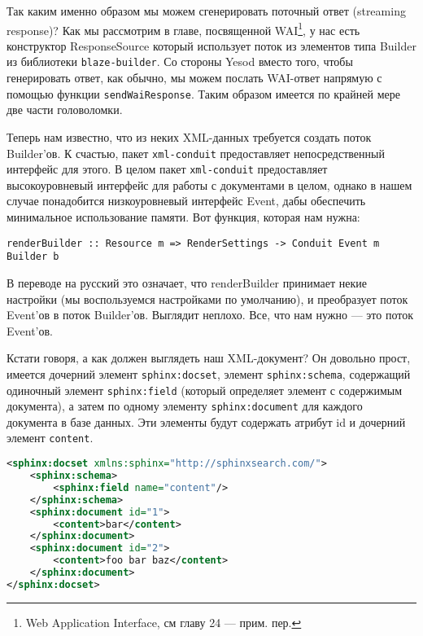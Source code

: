 Так каким именно образом мы можем сгенерировать поточный ответ (streaming response)? Как мы рассмотрим в главе, посвященной WAI\footnote{Web Application Interface, см главу 24 --- прим. пер.}, у нас есть конструктор ResponseSource который использует поток из элементов типа Builder из библиотеки \lstinline'blaze-builder'. Со стороны Yesod вместо того, чтобы генерировать ответ, как обычно, мы можем послать WAI-ответ напрямую с помощью функции \lstinline'sendWaiResponse'. Таким образом имеется по крайней мере две части головоломки. %

Теперь нам известно, что из неких XML-данных требуется создать поток Builder'ов. К счастью, пакет \lstinline'xml-conduit' предоставляет непосредственный интерфейс для этого. В целом пакет \lstinline'xml-conduit' предоставляет высокоуровневый интерфейс для работы с документами в целом, однако в нашем случае понадобится низкоуровневый интерфейс Event, дабы обеспечить минимальное использование памяти. Вот функция, которая нам нужна:

\begin{lstlisting}
renderBuilder :: Resource m => RenderSettings -> Conduit Event m Builder b
\end{lstlisting}

В переводе на русский это означает, что renderBuilder принимает некие настройки (мы воспользуемся настройками по умолчанию), и преобразует поток Event'ов в поток Builder'ов. Выглядит неплохо. Все, что нам нужно --- это поток Event'ов.

Кстати говоря, а как должен выглядеть наш XML-документ? Он довольно прост, имеется дочерний элемент \lstinline'sphinx:docset', элемент \lstinline'sphinx:schema', содержащий одиночный элемент \lstinline'sphinx:field' (который определяет элемент с содержимым документа), а затем по одному элементу \lstinline'sphinx:document' для каждого документа в базе данных. Эти элементы будут содержать атрибут id и дочерний элемент \lstinline'content'.

\begin{lstlisting}[language=XML] % Пример xmlpipe-документа / Sample xmlpipe document
<sphinx:docset xmlns:sphinx="http://sphinxsearch.com/">
    <sphinx:schema>
        <sphinx:field name="content"/>
    </sphinx:schema>
    <sphinx:document id="1">
        <content>bar</content>
    </sphinx:document>
    <sphinx:document id="2">
        <content>foo bar baz</content>
    </sphinx:document>
</sphinx:docset>
\end{lstlisting}

